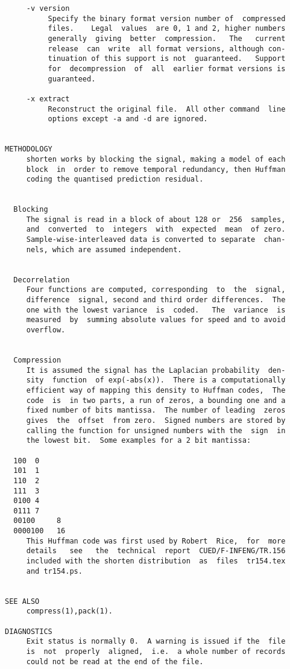 \begin{verbatim}
     -v version
          Specify the binary format version number of  compressed
          files.    Legal  values  are 0, 1 and 2, higher numbers
          generally  giving  better  compression.   The   current
          release  can  write  all format versions, although con-
          tinuation of this support is not  guaranteed.   Support
          for  decompression  of  all  earlier format versions is
          guaranteed.

     -x extract
          Reconstruct the original file.  All other command  line
          options except -a and -d are ignored.


METHODOLOGY
     shorten works by blocking the signal, making a model of each
     block  in  order to remove temporal redundancy, then Huffman
     coding the quantised prediction residual.


  Blocking
     The signal is read in a block of about 128 or  256  samples,
     and  converted  to  integers  with  expected  mean  of zero.
     Sample-wise-interleaved data is converted to separate  chan-
     nels, which are assumed independent.


  Decorrelation
     Four functions are computed, corresponding  to  the  signal,
     difference  signal, second and third order differences.  The
     one with the lowest variance  is  coded.   The  variance  is
     measured  by  summing absolute values for speed and to avoid
     overflow.


  Compression
     It is assumed the signal has the Laplacian probability  den-
     sity  function  of exp(-abs(x)).  There is a computationally
     efficient way of mapping this density to Huffman codes,  The
     code  is  in two parts, a run of zeros, a bounding one and a
     fixed number of bits mantissa.  The number of leading  zeros
     gives  the  offset  from zero.  Signed numbers are stored by
     calling the function for unsigned numbers with the  sign  in
     the lowest bit.  Some examples for a 2 bit mantissa:

  100  0
  101  1
  110  2
  111  3
  0100 4
  0111 7
  00100     8
  0000100   16
     This Huffman code was first used by Robert  Rice,  for  more
     details   see   the  technical  report  CUED/F-INFENG/TR.156
     included with the shorten distribution  as  files  tr154.tex
     and tr154.ps.


SEE ALSO
     compress(1),pack(1).

DIAGNOSTICS
     Exit status is normally 0.  A warning is issued if the  file
     is  not  properly  aligned,  i.e.  a whole number of records
     could not be read at the end of the file.


\end{verbatim}
